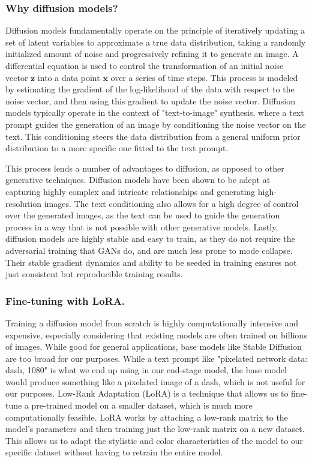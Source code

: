 \documentclass[acmsmall, nonacm]{acmart}
\begin{document}
\subsubsection{Why diffusion models?}
Diffusion models fundamentally operate on the principle of iteratively updating
a set of latent variables to approximate a true data distribution, taking
a randomly initialized amount of noise and progressively refining it to
generate an image. A differential equation is used to control the transformation
of an initial noise vector $\mathbf{z}$ into a data point $\mathbf{x}$ over a 
series of time steps. This process is modeled by estimating the gradient of the
log-likelihood of the data with respect to the noise vector, and then using this
gradient to update the noise vector. Diffusion models typically operate in the
context of "text-to-image" synthesis, where a text prompt guides the 
generation of an image by conditioning the noise vector on the text. This
conditioning steers the data distribution from a general uniform prior distribution
to a more specific one fitted to the text prompt.

This process lends a number of advantages to diffusion, as opposed to other
generative techniques. Diffusion models have been shown to be adept at capturing
highly complex and intricate relationships and generating high-resolution
images. The text conditioning also allows for a high degree of control over
the generated images, as the text can be used to guide the generation process
in a way that is not possible with other generative models. Lastly,
diffusion models are highly stable and easy to train, as they do not require
the adversarial training that GANs do, and are much less prone to mode collapse.
Their stable gradient dynamics and ability to be seeded in training
ensures not just consistent but reproducible training results.

\subsubsection{Fine-tuning with LoRA.} Training a diffusion model from scratch
is highly computationally intensive and expensive, especially considering that
existing models are often trained on billions of images. While good for general
applications, base models like Stable Diffusion are too broad for our purposes. 
While a text prompt like "pixelated network data: dash, 1080" is what we end up 
using in our end-stage model, the base model would produce something 
like a pixelated image of a dash, which is not useful for our purposes. Low-Rank
Adaptation (LoRA) is a technique that allows us to fine-tune a pre-trained model
on a smaller dataset, which is much more computationally feasible. LoRA works by
attaching a low-rank matrix to the model's parameters and then training just 
the low-rank matrix on a new dataset. This allows us to adapt the stylistic and
color characteristics of the model to our specific dataset without having to
retrain the entire model.
\end{document}
